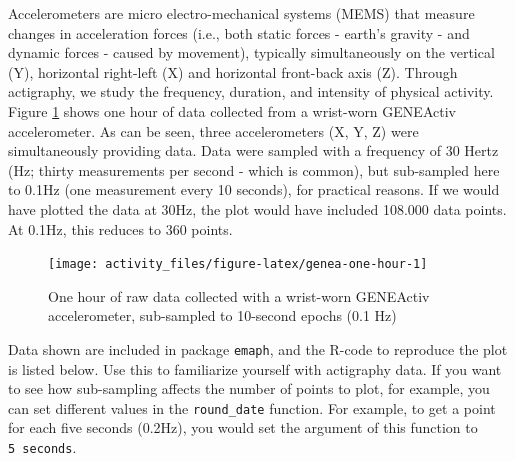 \documentclass[]{book}
\begin{document}
Accelerometers are micro electro-mechanical systems (MEMS) that measure
changes in acceleration forces (i.e., both static forces - earth's
gravity - and dynamic forces - caused by movement), typically
simultaneously on the vertical (Y), horizontal right-left (X) and
horizontal front-back axis (Z). Through actigraphy, we study the
frequency, duration, and intensity of physical activity. Figure
\ref{fig:genea-one-hour} shows one hour of data collected from a
wrist-worn GENEActiv accelerometer. As can be seen, three accelerometers
(X, Y, Z) were simultaneously providing data. Data were sampled with a
frequency of 30 Hertz (Hz; thirty measurements per second - which is
common), but sub-sampled here to 0.1Hz (one measurement every 10
seconds), for practical reasons. If we would have plotted the data at
30Hz, the plot would have included 108.000 data points. At 0.1Hz, this
reduces to 360 points.

\begin{figure}

{\centering \texttt{[image: activity\_files/figure-latex/genea-one-hour-1]} 

}

\caption{One hour of raw data collected with a wrist-worn GENEActiv accelerometer, sub-sampled to 10-second epochs (0.1 Hz)}\label{fig:genea-one-hour}
\end{figure}

Data shown are included in package \texttt{emaph}, and the R-code to
reproduce the plot is listed below. Use this to familiarize yourself
with actigraphy data. If you want to see how sub-sampling affects the
number of points to plot, for example, you can set different values in
the \texttt{round\_date} function. For example, to get a point for each
five seconds (0.2Hz), you would set the argument of this function to
\texttt{5\ seconds}.
\end{document}
